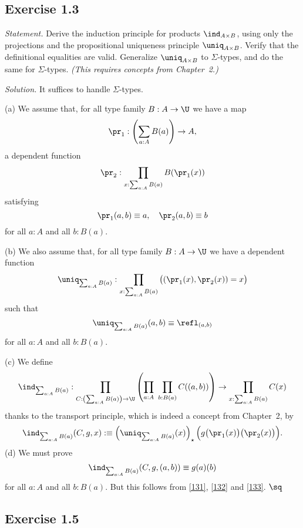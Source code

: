 \documentclass[12pt]{article}
\begin{document}
%

\subsection{Exercise 1.3} 

\emph{Statement.} Derive the induction principle for products $\ind_{A\times B}$, using only the projections and the propositional uniqueness principle $\uniq_{A\times B}$. Verify that the definitional equalities are valid. Generalize $\uniq_{A\times B}$ to $\Sigma$-types, and do the same for $\Sigma$-types. \emph{(This requires concepts from Chapter~2.)}

\nn\emph{Solution.} It suffices to handle $\Sigma$-types. 

\nn(a) We assume that, for all type family $B:A\to\U$ we have a map 
$$
\pr_1:\left(\sum_{a:A}B(a)\right)\to A,
$$ 
a dependent function 
$$
\pr_2:\prod_{x:\sum_{a:A}B(a)}B(\pr_1(x))
$$
satisfying
\begin{equation}\label{131}
\pr_1(a,b)\equiv a,\quad\pr_2(a,b)\equiv b
\end{equation}
for all $a:A$ and all $b:B(a)$.

\nn(b) We also assume that, for all type family $B:A\to\U$ we have a dependent function 
$$
\uniq_{\sum_{a:A}B(a)}:\prod_{x:\sum_{a:A}B(a)}\big((\pr_1(x),\pr_2(x))=x\big)
$$ 
such that 
\begin{equation}\label{132}
\uniq_{\sum_{a:A}B(a)}(a,b)\equiv\refl_{(a,b)}
\end{equation}
for all $a:A$ and all $b:B(a)$. 

\nn(c) We define
$$
\ind_{\sum_{a:A}B(a)}:\prod_{C:\left(\sum_{a:A}B(a)\right)\to\U} 
\left(\prod_{a:A}\ \prod_{b:B(a)}C((a,b))\right) 
\to\prod_{x:\sum_{a:A}B(a)}C(x)
$$
thanks to the transport principle, which is indeed a concept from Chapter~2, by
\begin{equation}\label{133}
\ind_{\sum_{a:A}B(a)}(C,g,x):\equiv\left(\uniq_{\sum_{a:A}B(a)}(x)\right)_\star\Big(g\big(\pr_1(x)\big)\big(\pr_2(x)\big)\Big).
\end{equation}
(d) We must prove 
$$
\ind_{\sum_{a:A}B(a)}(C,g,(a,b))\equiv g(a)(b)
$$
for all $a:A$ and all $b:B(a)$. But this follows from \eqref{131}, \eqref{132} and \eqref{133}. $\sq$


\subsection{Exercise 1.5}
\end{document}
